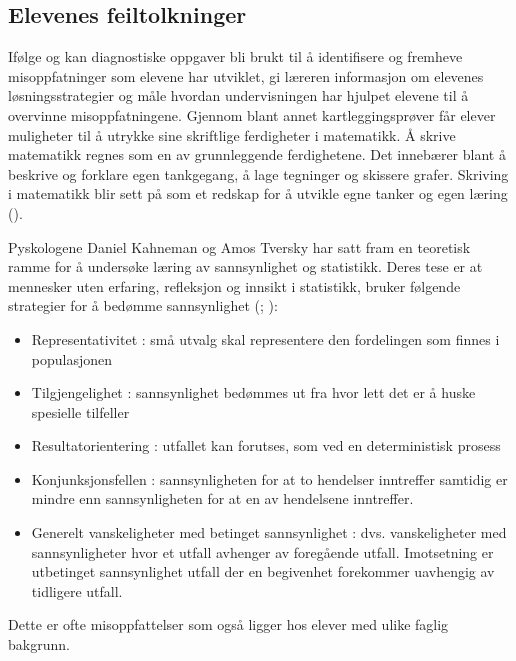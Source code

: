 \documentclass[main.tex]{subfiles}
\begin{document}
\subsection*{Elevenes feiltolkninger}
Ifølge  og  kan diagnostiske oppgaver bli brukt til å identifisere og 
fremheve misoppfatninger som elevene har utviklet, gi læreren informasjon om elevenes løsningsstrategier og måle hvordan 
undervisningen har hjulpet elevene til å overvinne misoppfatningene. Gjennom blant annet kartleggingsprøver får elever 
muligheter til å utrykke sine skriftlige ferdigheter i matematikk. Å skrive matematikk regnes som en av grunnleggende 
ferdighetene. Det innebærer blant å beskrive og forklare egen tankgegang, å lage tegninger og skissere grafer. 
Skriving i matematikk blir sett på som et redskap for å utvikle egne tanker og egen læring (). 

Pyskologene Daniel Kahneman og Amos Tversky har satt fram en teoretisk 
ramme for å undersøke læring av sannsynlighet og statistikk. Deres tese er at mennesker uten erfaring, refleksjon og 
innsikt i statistikk, bruker følgende strategier for å bedømme sannsynlighet (; ):
\begin{itemize}
\item Representativitet : små utvalg skal representere den fordelingen som finnes i populasjonen
\item Tilgjengelighet : sannsynlighet bedømmes ut fra hvor lett det er å huske spesielle tilfeller
\item Resultatorientering : utfallet kan forutses, som ved en deterministisk prosess
\item Konjunksjonsfellen : sannsynligheten for at to hendelser inntreffer samtidig er mindre enn sannsynligheten
for at en av hendelsene inntreffer.
\item Generelt vanskeligheter med betinget sannsynlighet : dvs. vanskeligheter med sannsynligheter hvor et utfall
avhenger av foregående utfall. Imotsetning er utbetinget sannsynlighet utfall der en begivenhet forekommer uavhengig 
av tidligere utfall. 
\end{itemize}
Dette er ofte misoppfattelser som også ligger hos elever med ulike faglig bakgrunn.
\newline
\end{document}
